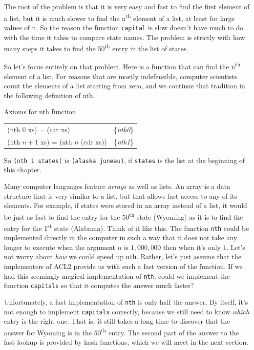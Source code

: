 The root of the problem is that it is very easy and fast to find the
first element of a list, but it is much slower to find the 
n\textsuperscript{th} element of a list, at least for large values 
of n. So the reason the function \texttt{capital} is slow doesn't 
have much to do with the time it takes to compare state names. The
problem is strictly with how many steps it takes to find the 
50\textsuperscript{th} entry in the list of states.

So let's focus entirely on that problem. Here is a function that 
can find the n\textsuperscript{th} element of a list. For reasons
that are mostly indefensible, computer scientists count the elements
of a list starting from zero, and we continue that tradition in 
the following definition of nth.
\begin{center}
Axioms for nth function
\begin{tabular}{ll}
(nth 0 xs) = (car xs)  & \{\emph{nth0}\}     \\
(nth $n+1$ xs) = (nth $n$ (cdr xs)) & \{\emph{nth1}\} \\
\end{tabular}
\end{center}
So \texttt{(nth 1 states)} is \texttt{(alaska juneau)}, if
\texttt{states} is the list at the beginning of this chapter.

Many computer languages feature \emph{arrays} as well as lists.
An array is a data structure that is very
similar to a list, but that allows fast access to any of its
elements. For example, if states were stored in an array instead
of a list, it would be just as fast to find the entry for the
50\textsuperscript{th} state (Wyoming) as it is to find the entry
for the 1\textsuperscript{st} state (Alabama). Think of it like
this. The function \texttt{nth} could be implemented directly in
the computer in such a way that it does not take any longer to 
execute when the argument $n$ is $1,000,000$ then when it's only $1$. 
Let's not worry about \emph{how} we could speed up \texttt{nth}.
Rather, let's just assume that the implementers of ACL2 provide
us with such a fast version of the function.
If we had this seemingly magical implementation of \texttt{nth}, 
could we implement the function \texttt{capitals} so that it computes the 
answer much faster?

Unfortunately, a fast implementation of \texttt{nth} is only half
the answer. By itself, it's not enough to implement \texttt{capitals}
correctly, because we still need to know \emph{which} entry is the
right one. That is, it still takes a long time to discover that the
answer for Wyoming is in the 50\textsuperscript{th} entry. The second
part of the answer to the fast lookup is provided by hash functions,
which we will meet in the next section.

